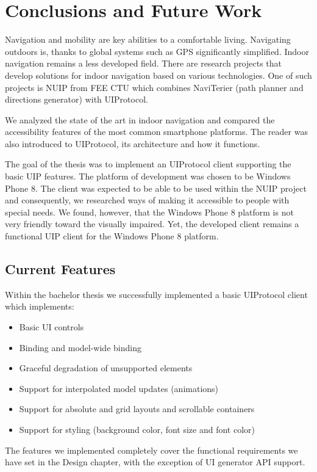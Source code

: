 \chapter{Conclusions and Future Work}
Navigation and mobility are key abilities to a comfortable living. Navigating outdoors is, thanks to global systems such as GPS significantly simplified. Indoor navigation remains a less developed field. There are research projects that develop solutions for indoor navigation based on various technologies. One of such projects is NUIP from FEE CTU which combines NaviTerier (path planner and directions generator) with UIProtocol.

We analyzed the state of the art in indoor navigation and compared the accessibility features of the most common smartphone platforms. The reader was also introduced to UIProtocol, its architecture and how it functions.

The goal of the thesis was to implement an UIProtocol client supporting the basic UIP features. The platform of development was chosen to be Windows Phone 8. The client was expected to be able to be used within the NUIP project and consequently, we researched ways of making it accessible to people with special needs. We found, however, that the Windows Phone 8 platform is not very friendly toward the visually impaired. Yet, the developed client remains a functional UIP client for the Windows Phone 8 platform.

\section{Current Features}
Within the bachelor thesis we successfully implemented a basic UIProtocol client which implements:

\begin{itemize}
  \item Basic UI controls  
  \item Binding and model-wide binding
  \item Graceful degradation of unsupported elements
  \item Support for interpolated model updates (animations)
  \item Support for absolute and grid layouts and scrollable containers
  \item Support for styling (background color, font size and font color)
\end{itemize}

The features we implemented completely cover the functional requirements we have set in the Design chapter, with the exception of UI generator API support.

